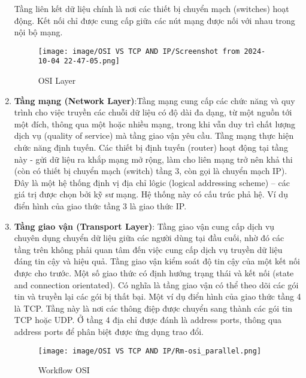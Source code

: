 \documentclass[a4paper,12pt]{article}
\begin{document}
\begin{enumerate}
Tầng liên kết dữ liệu chính là nơi các thiết bị chuyển mạch (switches) hoạt động. Kết nối chỉ được cung cấp giữa các nút mạng được nối với nhau trong nội bộ mạng.



\begin{figure}[htbp]
    \centering
    \texttt{[image: image/OSI VS TCP AND IP/Screenshot from 2024-10-04 22-47-05.png]}
    \caption{OSI Layer}
    \label{}
\end{figure}






    \item \textbf{Tầng mạng (Network Layer)}:Tầng mạng cung cấp các chức năng và quy trình cho việc truyền các chuỗi dữ liệu có độ dài đa dạng, từ một nguồn tới một đích, thông qua một hoặc nhiều mạng, trong khi vẫn duy trì chất lượng dịch vụ (quality of service) mà tầng giao vận yêu cầu. Tầng mạng thực hiện chức năng định tuyến. Các thiết bị định tuyến (router) hoạt động tại tầng này - gửi dữ liệu ra khắp mạng mở rộng, làm cho liên mạng trở nên khả thi (còn có thiết bị chuyển mạch (switch) tầng 3, còn gọi là chuyển mạch IP). Đây là một hệ thống định vị địa chỉ lôgic (logical addressing scheme) – các giá trị được chọn bởi kỹ sư mạng. Hệ thống này có cấu trúc phả hệ. Ví dụ điển hình của giao thức tầng 3 là giao thức IP.
    \item \textbf{Tầng giao vận (Transport Layer)}: Tầng giao vận cung cấp dịch vụ chuyên dụng chuyển dữ liệu giữa các người dùng tại đầu cuối, nhờ đó các tầng trên không phải quan tâm đến việc cung cấp dịch vụ truyền dữ liệu đáng tin cậy và hiệu quả. Tầng giao vận kiểm soát độ tin cậy của một kết nối được cho trước. Một số giao thức có định hướng trạng thái và kết nối (state and connection orientated). Có nghĩa là tầng giao vận có thể theo dõi các gói tin và truyền lại các gói bị thất bại. Một ví dụ điển hình của giao thức tầng 4 là TCP. Tầng này là nơi các thông điệp được chuyển sang thành các gói tin TCP hoặc UDP. Ở tầng 4 địa chỉ được đánh là address ports, thông qua address ports để phân biệt được ứng dụng trao đổi.


\begin{figure}[htbp]
    \centering
    \texttt{[image: image/OSI VS TCP AND IP/Rm-osi\_parallel.png]}
    \caption{Workflow OSI}
    \label{}
\end{figure}








\end{enumerate}
\end{document}

